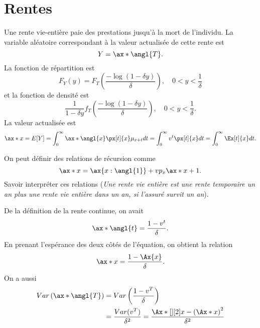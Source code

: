 \chapter{Rentes}

\begin{definition}{}{}
	Une rente vie-entière paie des prestations jusqu'à la mort de l'individu. La variable aléatoire correspondant à la valeur actualisée de cette rente est 
	$$Y = \ax*{\angl{T}}.$$
	La fonction de répartition est 
	$$F_Y(y) = F_T\left(\frac{-\log(1-\delta y)}{\delta}\right), \quad 0<y< \frac{1}{\delta}$$
	et la fonction de densité est
	$$\frac{1}{1- \delta y} f_T\left(\frac{-\log(1-\delta y)}{\delta}\right), \quad 0<y< \frac{1}{\delta}.$$
	La valeur actualisée est 
	$$\ax*{x} = E[Y] = \int_{0}^{\infty} \ax*{\angl{x}} \px[t]{x}\mu_{x + t} dt = \int_{0}^{\infty} v^t \px[t]{x} dt = \int_{0}^{\infty} \Ex[t]{x}dt.$$
\end{definition}

On peut définir des relations de récursion comme
$$\ax*{x} = \ax{x:\angl{1}} + vp_x \ax*{x+1}.$$ Savoir interpréter ces relations (\textit{Une rente vie entière est une rente temporaire un an plus une rente vie entière dans un an, si l'assuré survit un an}).

De la définition de la rente continue, on avait
$$\ax*{\angl{t}} = \frac{1 - v^t}{\delta}.$$
En prenant l'espérance des deux côtés de l'équation, on obtient la relation 
$$\ax*{x} = \frac{1 - \Ax{x}}{\delta}.$$
On a aussi 
\begin{align*}
Var\left(\ax*{\angl{T}}\right) &= Var \left(\frac{1 - v^T}{\delta}\right)\\
&= \frac{Var(v^T)}{\delta^2} = \frac{\Ax*[][2]{x} - \left(\Ax*{x}\right)^2}{\delta^2}
\end{align*}






























